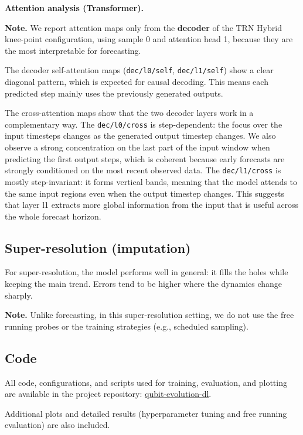 \noindent\textbf{Attention analysis (Transformer).}

\vspace{\baselineskip}

\noindent\textbf{Note.} We report attention maps only from the \textbf{decoder} of the TRN Hybrid knee-point configuration, using sample 0 and attention head 1, because they are the most interpretable for forecasting.

\vspace{\baselineskip}



The decoder self-attention maps (\texttt{dec/l0/self}, \texttt{dec/l1/self}) show a clear diagonal pattern, which is expected for causal decoding. This means each predicted step mainly uses the previously generated outputs.

\vspace{\baselineskip}

The cross-attention maps show that the two decoder layers work in a complementary way. The \texttt{dec/l0/cross} is step-dependent: the focus over the input timesteps changes as the generated output timestep changes. We also observe a strong concentration on the last part of the input window when predicting the first output steps, which is coherent because early forecasts are strongly conditioned on the most recent observed data. The \texttt{dec/l1/cross} is mostly step-invariant: it forms vertical bands, meaning that the model attends to the same input regions even when the output timestep changes. This suggests that layer l1 extracts more global information from the input that is useful across the whole forecast horizon.

\subsection{Super-resolution (imputation)}
\label{sec:results_superres}



For super-resolution, the model performs well in general: it fills the holes while keeping the main trend. Errors tend to be higher where the dynamics change sharply.

\noindent\textbf{Note.} Unlike forecasting, in this super-resolution setting, we do not use the free running probes or the training strategies (e.g., scheduled sampling).

\subsection*{Code}
All code, configurations, and scripts used for training, evaluation, and plotting are available in the project repository:
\href{https://github.com/GiuseppeRudi/qubit-evolution-dl}{qubit-evolution-dl}.

\noindent Additional plots and detailed results (hyperparameter tuning and free running evaluation) are also included.